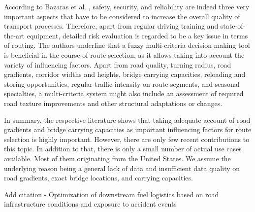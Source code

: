 \par
According to Bazaras et al. \cite{Bazaras.2013}, safety, security, and reliability are indeed three very important aspects that have to be considered to increase the overall quality of transport processes. Therefore, apart from regular driving training and state-of-the-art equipment, detailed risk evaluation is regarded to be a key issue in terms of \ohc routing. The authors underline that a fuzzy multi-criteria decision making tool is beneficial in the course of route selection, as it allows taking into account the variety of influencing factors. Apart from road quality, turning radius, road gradients, corridor widths and heights, bridge carrying capacities, reloading and storing opportunities, regular traffic intensity on route segments, and seasonal specialties, a multi-criteria system might also include an assessment of required road texture improvements and other structural adaptations or changes.
\par
In summary, the respective literature shows that taking adequate account of road gradients and bridge carrying capacities as important influencing factors for \ohc route selection is highly important. However, there are only few recent contributions to this topic. In addition to that, there is only a small number of actual use cases available. Most of them originating from the United States. We assume the underlying reason being a general lack of data and insufficient data quality on road gradients, exact bridge locations, and carrying capacities.

{\color{blue}
Add citation \citet{CARRESE2019} -
Optimization of downstream fuel logistics based on road infrastructure conditions and exposure to accident events
}



%
%
%
%
